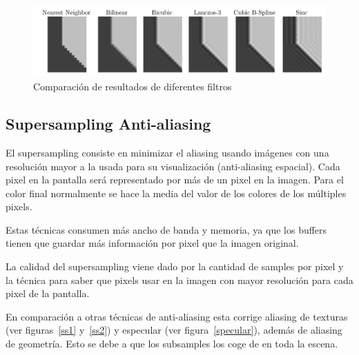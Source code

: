 \documentclass[withindex, glossary]{cam-thesis}
\begin{document}
\begin{figure}[!htbp]
    \includegraphics[width=\linewidth]{figures/comparison-filter.png}
    \caption{Comparación de resultados de diferentes filtros\cite{resampling2}}
\end{figure}

\subsection{Supersampling Anti-aliasing}

El supersampling consiste en minimizar el aliasing usando imágenes con una resolución mayor a la usada para su visualización (anti-aliasing espacial). Cada pixel en la pantalla será representado por más de un pixel en la imagen. Para el color final normalmente se hace la media del valor de los colores de los múltiples pixels\cite{Beets2000SupersamplingAA}.

Estas técnicas consumen más ancho de banda y memoria, ya que los buffers tienen que guardar más información por pixel que la imagen original.

La calidad del supersampling viene dado por la cantidad de samples por pixel y la técnica para saber que pixels usar en la imagen con mayor resolución para cada pixel de la pantalla.

En comparación a otras técnicas de anti-aliasing esta corrige aliasing de texturas (ver figuras~\ref{ss1} y~\ref{ss2}) y especular (ver figura~\ref{specular}), además de aliasing de geometría. Esto se debe a que los subsamples los coge de en toda la escena.
\end{document}
